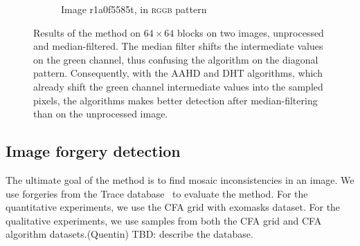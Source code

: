 \documentclass{ipol}
\newcommand{\qb}[1]{\textcolor{c1}{(Quentin) #1}}
\begin{document}
\begin{figure}[ht]
\begin{subfigure}[t]{\linewidth}
\begin{tabular}{ccccccccc}
                \bottomrule
        \end{tabular}
        \caption{Image r1a0f5585t, in \textsc{rggb} pattern}
\end{subfigure}
\caption{Results of the method on $64\times64$ blocks on two images, unprocessed and median-filtered. The median filter shifts the intermediate values on the green channel, thus confusing the algorithm on the diagonal pattern. Consequently, with the AAHD and DHT algorithms, which already shift the green channel intermediate values into the sampled pixels, the algorithms makes better detection after median-filtering than on the unprocessed image.}
\label{fig:median}
\end{figure}
\fi

\clearpage
\subsection{Image forgery detection}
The ultimate goal of the method is to find mosaic inconsistencies in an image. We use forgeries from the Trace database~\cite{trace} to evaluate the method. For the quantitative experiments, we use the CFA grid with exomasks dataset. For the qualitative experiments, we use samples from both the CFA grid and CFA algorithm datasets.\qb{TBD: describe the database.}
\end{document}
